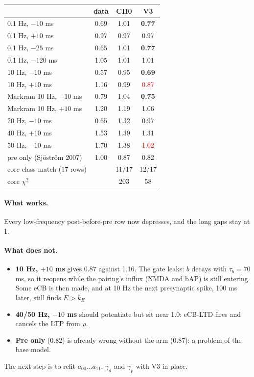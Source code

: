 \documentclass[11pt]{article}
\begin{document}
\begin{center}
\begin{tabular}{l c c c}
\toprule
 & data & CH0 & V3 \\
\midrule
0.1 Hz, $-10$ ms & 0.69 & 1.01 & \textbf{0.77} \\
0.1 Hz, $+10$ ms & 0.97 & 0.97 & 0.97 \\
0.1 Hz, $-25$ ms & 0.65 & 1.01 & \textbf{0.77} \\
0.1 Hz, $-120$ ms & 1.05 & 1.01 & 1.01 \\
10 Hz, $-10$ ms & 0.57 & 0.95 & \textbf{0.69} \\
10 Hz, $+10$ ms & 1.16 & 0.99 & \textcolor{red}{0.87} \\
Markram 10 Hz, $-10$ ms & 0.79 & 1.04 & \textbf{0.75} \\
Markram 10 Hz, $+10$ ms & 1.20 & 1.19 & 1.06 \\
20 Hz, $-10$ ms & 0.65 & 1.32 & 0.97 \\
40 Hz, $+10$ ms & 1.53 & 1.39 & 1.31 \\
50 Hz, $-10$ ms & 1.70 & 1.38 & \textcolor{red}{1.02} \\
pre only (Sj\"ostr\"om 2007) & 1.00 & 0.87 & 0.82 \\
\midrule
core class match (17 rows) & & 11/17 & 12/17 \\
core $\chi^2$ & & 203 & 58 \\
\bottomrule
\end{tabular}
\end{center}

\paragraph{What works.} Every low-frequency post-before-pre row now depresses, and the long gaps stay at 1.

\paragraph{What does not.}
\begin{itemize}
  \item \textbf{10 Hz, $+10$ ms} gives 0.87 against 1.16. The gate leaks: $b$ decays with $\tau_b=70$ ms, so it
        reopens while the pairing's influx (NMDA and bAP) is still entering. Some eCB is then made, and at 10 Hz the
        next presynaptic spike, 100 ms later, still finds $E>k_E$.
  \item \textbf{40/50 Hz, $-10$ ms} should potentiate but sit near 1.0: eCB-LTD fires and cancels the LTP from
        $\rho$.
  \item \textbf{Pre only} (0.82) is already wrong without the arm (0.87): a problem of the base model.
\end{itemize}
The next step is to refit $a_{00}\dots a_{11}$, $\gamma_d$ and $\gamma_p$ with V3 in place.
\end{document}
